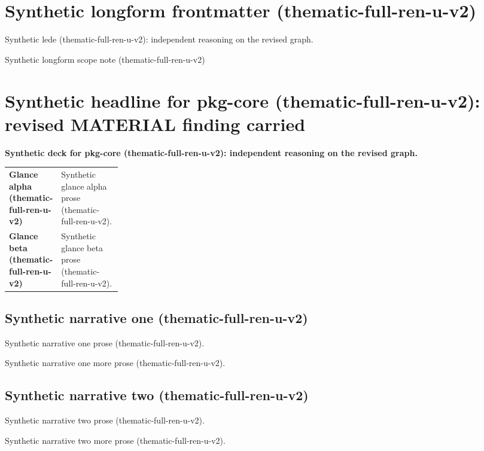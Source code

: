 \documentclass[lualatex,a4paper,10pt]{jlreq}
\begin{document}
\surveycover
\clearpage
\section*{Synthetic longform frontmatter (thematic-full-ren-u-v2)}
Synthetic lede (thematic-full-ren-u-v2): independent reasoning on the revised graph.

\begin{claimboundary}
\noindent Synthetic longform scope note (thematic-full-ren-u-v2)\par
\end{claimboundary}
\medskip
\tableofcontents
\clearpage
\Needspace{0.24\textheight}
\section{Synthetic headline for pkg-core (thematic-full-ren-u-v2): revised MATERIAL finding carried}
\label{pkg:pkg-core}
\noindent\textbf{Synthetic deck for pkg-core (thematic-full-ren-u-v2): independent reasoning on the revised graph.} \cite{sp001lnd001}\par\medskip
\begin{themeoverview}
\begin{tabularx}{\linewidth}{@{}>{\bfseries}p{0.22\linewidth}X@{}}
Glance alpha (thematic-full-ren-u-v2) & Synthetic glance alpha prose (thematic-full-ren-u-v2). \cite{sp001lnd001} \\
Glance beta (thematic-full-ren-u-v2) & Synthetic glance beta prose (thematic-full-ren-u-v2). \cite{sp001lnd001} \\
\end{tabularx}
\end{themeoverview}
\medskip
\begin{multicols}{2}
\subsection*{Synthetic narrative one (thematic-full-ren-u-v2)}
\noindent Synthetic narrative one prose (thematic-full-ren-u-v2). \cite{sp001lnd001}\par\medskip
\noindent Synthetic narrative one more prose (thematic-full-ren-u-v2). \cite{sp001lnd001}\par\medskip
\subsection*{Synthetic narrative two (thematic-full-ren-u-v2)}
\noindent Synthetic narrative two prose (thematic-full-ren-u-v2). \cite{sp001lnd001}\par\medskip
\noindent Synthetic narrative two more prose (thematic-full-ren-u-v2). \cite{sp001lnd001}\par\medskip
\end{multicols}
\end{document}
